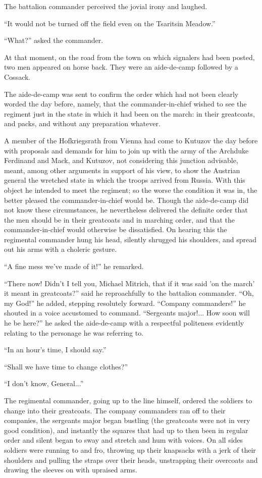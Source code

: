 The battalion commander perceived the jovial irony and laughed.

``It would not be turned off the field even on the Tsaritsin
Meadow.''

``What?'' asked the commander.

At that moment, on the road from the town on which signalers had
been posted, two men appeared on horse back. They were an
aide-de-camp followed by a Cossack.

The aide-de-camp was sent to confirm the order which had not been
clearly worded the day before, namely, that the
commander-in-chief wished to see the regiment just in the state
in which it had been on the march: in their greatcoats, and
packs, and without any preparation whatever.

A member of the Hofkriegsrath from Vienna had come to Kutuzov the
day before with proposals and demands for him to join up with the
army of the Archduke Ferdinand and Mack, and Kutuzov, not
considering this junction advisable, meant, among other arguments
in support of his view, to show the Austrian general the wretched
state in which the troops arrived from Russia. With this object
he intended to meet the regiment; so the worse the condition it
was in, the better pleased the commander-in-chief would
be. Though the aide-de-camp did not know these circumstances, he
nevertheless delivered the definite order that the men should be
in their greatcoats and in marching order, and that the
commander-in-chief would otherwise be dissatisfied. On hearing
this the regimental commander hung his head, silently shrugged
his shoulders, and spread out his arms with a choleric gesture.

``A fine mess we've made of it!'' he remarked.

``There now! Didn't I tell you, Michael Mitrich, that if it was
said 'on the march' it meant in greatcoats?'' said he
reproachfully to the battalion commander. ``Oh, my God!'' he
added, stepping resolutely forward. ``Company commanders!'' he
shouted in a voice accustomed to command. ``Sergeants
major!... How soon will he be here?'' he asked the aide-de-camp
with a respectful politeness evidently relating to the personage
he was referring to.

``In an hour's time, I should say.''

``Shall we have time to change clothes?''

``I don't know, General...''

The regimental commander, going up to the line himself, ordered
the soldiers to change into their greatcoats. The company
commanders ran off to their companies, the sergeants major began
bustling (the greatcoats were not in very good condition), and
instantly the squares that had up to then been in regular order
and silent began to sway and stretch and hum with voices. On all
sides soldiers were running to and fro, throwing up their
knapsacks with a jerk of their shoulders and pulling the straps
over their heads, unstrapping their overcoats and drawing the
sleeves on with upraised arms.

